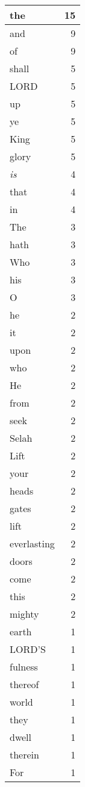 \begin{center}
\begin{longtable}{l|r}
\hline \hline
\endlastfoot
the & 15 \\ \hline
and & 9 \\ \hline
of & 9 \\ \hline
shall & 5 \\ \hline
LORD & 5 \\ \hline
up & 5 \\ \hline
ye & 5 \\ \hline
King & 5 \\ \hline
glory & 5 \\ \hline
\emph{is} & 4 \\ \hline
that & 4 \\ \hline
in & 4 \\ \hline
The & 3 \\ \hline
hath & 3 \\ \hline
Who & 3 \\ \hline
his & 3 \\ \hline
O & 3 \\ \hline
he & 2 \\ \hline
it & 2 \\ \hline
upon & 2 \\ \hline
who & 2 \\ \hline
He & 2 \\ \hline
from & 2 \\ \hline
seek & 2 \\ \hline
Selah & 2 \\ \hline
Lift & 2 \\ \hline
your & 2 \\ \hline
heads & 2 \\ \hline
gates & 2 \\ \hline
lift & 2 \\ \hline
everlasting & 2 \\ \hline
doors & 2 \\ \hline
come & 2 \\ \hline
this & 2 \\ \hline
mighty & 2 \\ \hline
earth & 1 \\ \hline
LORD'S & 1 \\ \hline
fulness & 1 \\ \hline
thereof & 1 \\ \hline
world & 1 \\ \hline
they & 1 \\ \hline
dwell & 1 \\ \hline
therein & 1 \\ \hline
For & 1 \\ \hline

\end{longtable}
\end{center}
